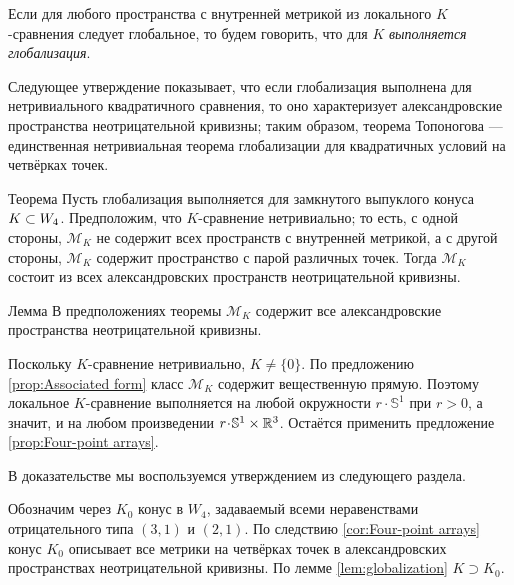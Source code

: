 Если для любого пространства с внутренней метрикой из локального \(K\)-сравнения следует глобальное, то будем говорить, что для $K$ \emph{выполняется глобализация}.

Следующее утверждение показывает, что если глобализация выполнена для нетривиального квадратичного сравнения, то оно характеризует александровские пространства неотрицательной кривизны;
таким образом, теорема Топоногова --- единственная нетривиальная теорема глобализации для квадратичных условий на четвёрках точек.

\begin{thm}{Теорема}\label{thm:globalization}
Пусть глобализация выполняется для замкнутого выпуклого конуса $K\z\subset W_4$.
Предположим, что $K$-сравнение нетривиально;
то есть, с одной стороны, $\mathcal{M}_K$ не содержит всех пространств с внутренней метрикой, а с другой стороны, $\mathcal{M}_K$ содержит пространство с парой различных точек.
Тогда $\mathcal{M}_K$ состоит из всех александровских пространств неотрицательной кривизны.
\end{thm}

\begin{thm}{Лемма}\label{lem:globalization}
В предположениях теоремы $\mathcal{M}_K$ содержит все александровские пространства неотрицательной кривизны.
\end{thm}

Поскольку $K$-сравнение нетривиально, $K\ne\{0\}$.
По предложению \ref{prop:Associated form} класс $\mathcal{M}_K$ содержит вещественную прямую.
Поэтому локальное $K$-сравнение выполняется
на любой окружности $r\cdot \mathbb{S}^1$ при $r>0$, а значит, и на любом произведении $r\cdot \mathbb{S}^1\times\RR^3$.
Остаётся применить предложение \ref{prop:Four-point arrays}.
\qeds

В доказательстве мы воспользуемся утверждением из следующего раздела.

Обозначим через $K_0$ конус в $W_4$, задаваемый всеми неравенствами отрицательного типа $(3,1)$ и $(2,1)$.
По следствию \ref{cor:Four-point arrays} конус $K_0$ описывает все метрики на четвёрках точек в александровских пространствах неотрицательной кривизны.
По лемме \ref{lem:globalization} $K\supset K_0$.

